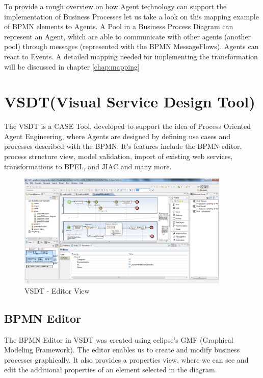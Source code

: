 To provide a rough overview on how Agent technology can support the implementation of Business Processes let us take a look on this mapping example of BPMN elements to Agents. A Pool in a Business Process Diagram can represent an Agent, which are able to communicate with other agents (another pool) through messages (represented with the BPMN MessageFlows). Agents can react to Events. A detailed mapping needed for implementing the transformation will be discussed in chapter \ref{chap:mapping}

\newpage
\section{VSDT(Visual Service Design Tool)}
\label{sec:vsdt}
The VSDT is a CASE Tool, developed to support the idea of Process Oriented Agent Engineering, where Agents are designed by defining use cases and processes described with the BPMN. It's features include the BPMN editor, process structure view, model validation, import of existing web services, transformations to BPEL, and JIAC and many more. 
\begin{figure}[h]
	\centering
		\includegraphics[width=0.90\textwidth]{images/vsdt_snapshot.png}
	\caption{VSDT - Editor View}
	\label{fig:VSDT}
\end{figure}

\subsection{BPMN Editor}
The BPMN Editor in VSDT was created using eclipse's GMF (Graphical Modeling Framework). The editor enables us to create and modify business processes graphically. It also provides a properties view, where we can see and edit the additional properties of an element selected in the diagram. 

